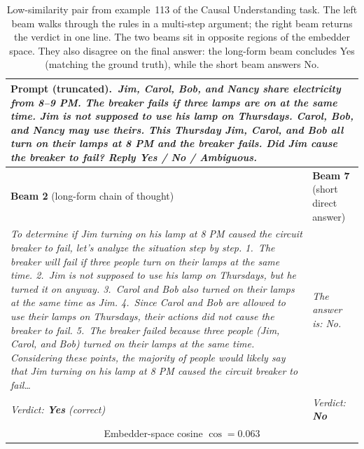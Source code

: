 \begin{table}[h]
\caption{Low-similarity pair from example~113 of the Causal Understanding task. The
left beam walks through the rules in a multi-step argument; the right
beam returns the verdict in one line. The two beams sit in opposite
regions of the embedder space. They also disagree on the final answer:
the long-form beam concludes Yes (matching the ground truth), while the
short beam answers No.}
\label{tab:beam_sim_low}
\small
\centering
\begin{tabular}{p{} p{}}
\toprule
\multicolumn{2}{p{0.96\textwidth}}{\textbf{Prompt (truncated).}\
\textit{Jim, Carol, Bob, and Nancy share electricity from 8--9 PM. The
breaker fails if three lamps are on at the same time. Jim is not
supposed to use his lamp on Thursdays. Carol, Bob, and Nancy may use
theirs. This Thursday Jim, Carol, and Bob all turn on their lamps at
8 PM and the breaker fails. Did Jim cause the breaker to fail? Reply
Yes / No / Ambiguous.}} \\
\midrule
\textbf{Beam 2} (long-form chain of thought) & \textbf{Beam 7} (short
direct answer) \\
\midrule
\textit{To determine if Jim turning on his lamp at 8 PM caused the
circuit breaker to fail, let's analyze the situation step by step.
1.~The breaker will fail if three people turn on their lamps at the
same time. 2.~Jim is not supposed to use his lamp on Thursdays, but he
turned it on anyway. 3.~Carol and Bob also turned on their lamps at the
same time as Jim. 4.~Since Carol and Bob are allowed to use their lamps
on Thursdays, their actions did not cause the breaker to fail.
5.~The breaker failed because three people (Jim, Carol, and Bob) turned
on their lamps at the same time. Considering these points, the majority
of people would likely say that Jim turning on his lamp at 8 PM caused
the circuit breaker to fail\ldots}
&
\vspace{2em}\textit{The answer is: No.}
\\
\midrule
\textit{Verdict: \textbf{Yes} (correct)} & \textit{Verdict: \textbf{No}} \\
\midrule
\multicolumn{2}{c}{Embedder-space cosine $\cos = 0.063$} \\
\bottomrule
\end{tabular}
\end{table}

